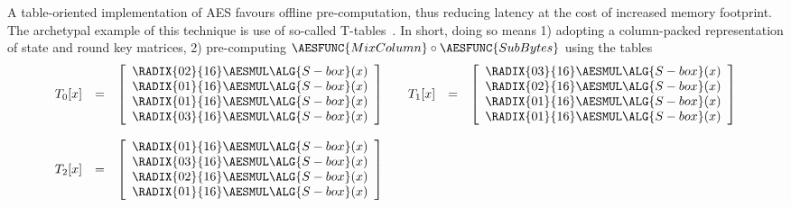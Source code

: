 A  table-oriented implementation of AES favours
offline pre-computation,
thus reducing 
latency
at the cost of increased 
memory footprint.
The archetypal example of this technique is use of so-called
T-tables~\cite[Section 4.2]{DaeRij:02}.
In short, doing so means
1) adopting a 
   column-packed
   representation of state and round key matrices,
2) pre-computing
   $
   \AESFUNC{MixColumn} \circ \AESFUNC{SubBytes}
   $
   using the tables
   \[
   \begin{array}{cc}
   \begin{array}{lcl}
   T_0[x] &=& \left[\begin{array}{c}
                    \RADIX{02}{16} \AESMUL \ALG{S-box}( x ) \\
                    \RADIX{01}{16} \AESMUL \ALG{S-box}( x ) \\
                    \RADIX{01}{16} \AESMUL \ALG{S-box}( x ) \\
                    \RADIX{03}{16} \AESMUL \ALG{S-box}( x ) \\
                    \end{array} \right]
   \end{array}
   &
   \begin{array}{lcl}
   T_1[x] &=& \left[\begin{array}{c}
                    \RADIX{03}{16} \AESMUL \ALG{S-box}( x ) \\
                    \RADIX{02}{16} \AESMUL \ALG{S-box}( x ) \\
                    \RADIX{01}{16} \AESMUL \ALG{S-box}( x ) \\
                    \RADIX{01}{16} \AESMUL \ALG{S-box}( x ) \\
                    \end{array} \right]
   \end{array}
   \\\\
   \begin{array}{lcl}
   T_2[x] &=& \left[\begin{array}{c}
                    \RADIX{01}{16} \AESMUL \ALG{S-box}( x ) \\
                    \RADIX{03}{16} \AESMUL \ALG{S-box}( x ) \\
                    \RADIX{02}{16} \AESMUL \ALG{S-box}( x ) \\
                    \RADIX{01}{16} \AESMUL \ALG{S-box}( x ) \\
                    \end{array} \right]                 

\end{array}
\end{array}\]
